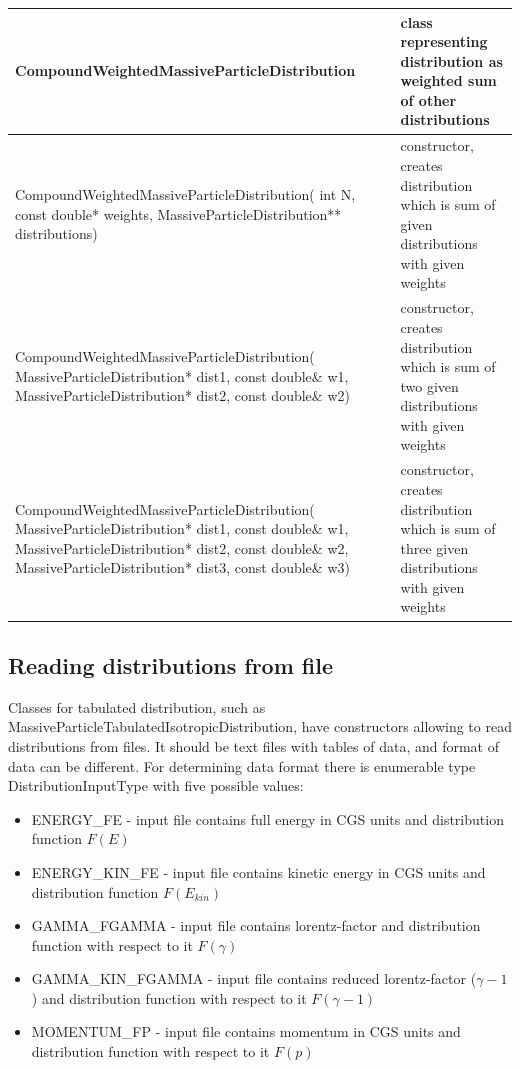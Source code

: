\begin{small}
\begin{xtabular}{|p{0.57\textwidth}|p{0.43\textwidth}|}
		\hline
		\textbf{CompoundWeightedMassiveParticleDistribution} & class representing distribution as weighted sum of other distributions\\
		\hline
		CompoundWeightedMassiveParticleDistribution( int N, const double* weights, MassiveParticleDistribution** distributions) & constructor, creates distribution which is sum of given distributions with given weights\\
		\hline
		CompoundWeightedMassiveParticleDistribution( MassiveParticleDistribution* dist1, const double\& w1, MassiveParticleDistribution* dist2, const double\& w2) & constructor, creates distribution which is sum of two given distributions with given weights\\
		\hline
		CompoundWeightedMassiveParticleDistribution( MassiveParticleDistribution* dist1, const double\& w1, MassiveParticleDistribution* dist2, const double\& w2, MassiveParticleDistribution* dist3, const double\& w3) & constructor, creates distribution which is sum of three given distributions with given weights\\
		\hline
		
	\end{xtabular}
\end{small}

\subsection{Reading distributions from file}
Classes for tabulated distribution, such as MassiveParticleTabulatedIsotropicDistribution, have constructors allowing to read distributions from files. It should be text files with tables of data, and format of data can be different. For determining data format there is enumerable type DistributionInputType with five possible values:

\begin{itemize}
	\item ENERGY\_FE - input file contains full energy in CGS units and distribution function $F(E)$
	\item ENERGY\_KIN\_FE - input file contains kinetic energy in CGS units and distribution function $F(E_{kin})$
	\item GAMMA\_FGAMMA - input file contains lorentz-factor and distribution function with respect to it $F(\gamma)$
	\item GAMMA\_KIN\_FGAMMA - input file contains reduced lorentz-factor ($\gamma - 1$) and distribution function with respect to it $F(\gamma-1)$
	\item MOMENTUM\_FP - input file contains momentum in CGS units and distribution function with respect to it $F(p)$
\end{itemize}


